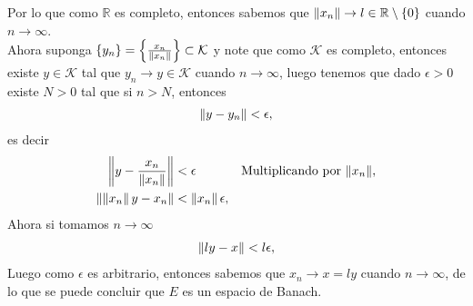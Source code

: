 \begin{homeworkProblem}
\begin{solution}
    Por lo que como $\mathbb{R}$ es completo, entonces sabemos que $\left\|x_n\right\|\to l\in\mathbb{R}\setminus\{0\}$ cuando $n\to \infty$.\\
    Ahora suponga $\{y_n\}=\left\{\frac{x_n}{\left\|x_n\right\|}\right\}\subset\mathcal{K}$ y note que como $\mathcal{K}$ es completo, entonces existe $y\in \mathcal{K}$ tal que $y_n\to y\in \mathcal{K}$ cuando $n\to\infty$, luego tenemos que dado $\epsilon>0$ existe $N>0$ tal que si $n>N$, entonces
    \begin{align*}
      \left\|y-y_n\right\|<\epsilon,
    \end{align*}
    es decir
    \begin{align*}
      \left\|y-\frac{x_n}{\left\|x_n\right\|}\right\|&<\epsilon &&\text{Multiplicando por $\left\|x_n\right\|$},\\
      \left\|\left\|x_n\right\|y-x_n\right\|&<\left\|x_n\right\|\epsilon,
    \end{align*}
    Ahora si tomamos $n\to\infty$
    \begin{align*}
      \left\|ly-x\right\|<l\epsilon,
    \end{align*}
    Luego como $\epsilon$ es arbitrario, entonces sabemos que $x_n\to x=ly$ cuando $n\to\infty$, de lo que se puede concluir que $E$ es un espacio de Banach. 
  \end{solution}
\end{homeworkProblem}
